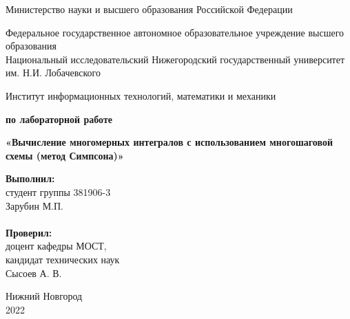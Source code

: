 \documentclass{report}
\begin{document}
\begin{titlepage}

\begin{center}
Министерство науки и высшего образования Российской Федерации
\end{center}

\begin{center}
Федеральное государственное автономное образовательное учреждение высшего образования \\
Национальный исследовательский Нижегородский государственный университет им. Н.И. Лобачевского
\end{center}

\begin{center}
Институт информационных технологий, математики и механики
\end{center}

\vspace{4em}

\begin{center}
\textbf{ по лабораторной работе} \\
\end{center}
\begin{center}
\textbf{\Large«Вычисление многомерных интегралов с использованием многошаговой схемы (метод Симпсона)»} \\
\end{center}

\vspace{4em}

\newbox{\lbox}
\newlength{\maxl}
\setlength{\maxl}{\wd\lbox}
\hfill\parbox{7cm}{
\hspace*{5cm}\hspace*{-5cm}\textbf{Выполнил:} \\ студент группы 381906-3 \\ Зарубин М.П.\\
\\
\hspace*{5cm}\hspace*{-5cm}\textbf{Проверил:}\\ доцент кафедры МОСТ, \\ кандидат технических наук \\ Сысоев А. В.\\
}
\vspace{\fill}

\begin{center} Нижний Новгород \\ 2022 \end{center}

\end{titlepage}
\end{document}

